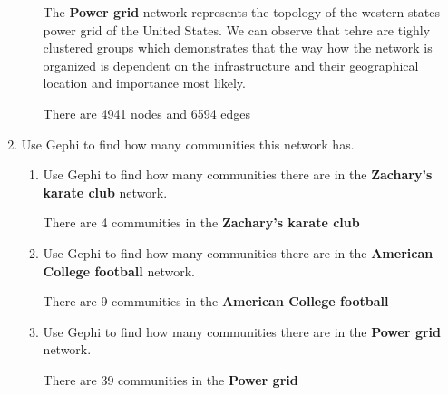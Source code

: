 \documentclass{amsart}
\theoremstyle{definition}
\theoremstyle{remark}
\numberwithin{equation}{section}
\begin{document}
\begin{enumerate}
\begin{enumerate}
        The \textbf{Power grid} network represents the topology of the western states power grid of the United States. We can observe that tehre are tighly clustered groups which demonstrates that the way how the network is organized is dependent on the infrastructure and their geographical location and importance most likely.

        There are 4941 nodes and 6594 edges

        \vspace{0.5 cm}

    \end{enumerate}
    \item Use Gephi to find how many communities this network has. \vspace{0.5 cm}
    \begin{enumerate}
        \item Use Gephi to find how many communities there are in the \textbf{Zachary's karate club} network. \vspace{0.5 cm} 

        There are 4 communities in the \textbf{Zachary's karate club} \vspace{0.5 cm}

        \item Use Gephi to find how many communities there are in the \textbf{American College football} network. \vspace{0.5 cm}

        There are 9 communities in the \textbf{American College football} \vspace{0.5 cm}

        \item Use Gephi to find how many communities there are in the \textbf{Power grid} network. \vspace{0.5 cm}

        There are 39 communities in the \textbf{Power grid} \vspace{0.5 cm}


\end{enumerate}
\end{enumerate}
\end{document}
